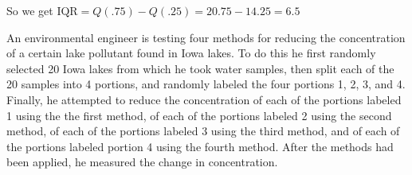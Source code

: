 \documentclass{examsetup}\usepackage[]{graphicx}\usepackage[]{color}
\begin{document}
\begin{questions}
\begin{parts}
\begin{solution}
      So we get $\text{IQR} = Q(.75) - Q(.25) = 20.75 - 14.25 = 6.5$
   \end{solution}

\end{parts}

\question

An environmental engineer is testing four methods for reducing the concentration of a certain lake pollutant found in Iowa lakes.
To do this he first randomly selected 20 Iowa lakes from which he took water samples,
then split each of the 20 samples into 4 portions, 
and randomly labeled the four portions 1, 2, 3, and 4. 
Finally, he attempted to reduce the concentration of each 
of the portions labeled 1 using the the first method, 
of each of the portions labeled 2 using the second method, 
of each of the portions labeled 3 using the third method, 
and of each of the portions labeled portion 4 using the fourth method. 
After the methods had been applied, he measured the change in concentration. \\

\end{questions}
\end{document}

